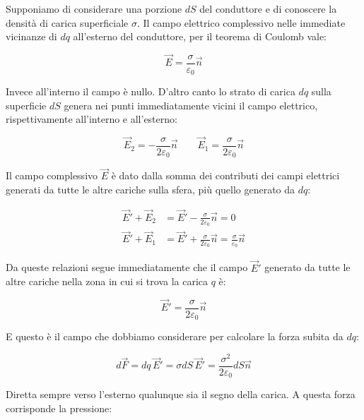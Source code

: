 \begin{figure}[htpb]
\end{figure}
\FloatBarrier

Supponiamo di considerare una porzione $dS$ del conduttore e di conoscere la densità di carica superficiale $ \sigma  $. Il campo elettrico complessivo nelle immediate vicinanze di $dq$ all'esterno del conduttore, per il teorema di Coulomb vale:

\[
	\vec{E} = \frac{\sigma}{\varepsilon_0} \vec{n}
\]

Invece all'interno il campo è nullo. D'altro canto lo strato di carica $dq$ sulla superficie $dS$ genera nei punti immediatamente vicini il campo elettrico, rispettivamente all'interno e all'esterno:

\[
	\vec{E}_2 = - \frac{\sigma}{2\varepsilon_0} \vec{n} \qquad \vec{E}_1=\frac{\sigma}{2\varepsilon_0}\vec{n}
\]

Il campo complessivo $\vec{E}$ è dato dalla somma dei contributi dei campi elettrici generati da tutte le altre cariche sulla sfera, più quello generato da $dq$:

\begin{align*}
	\vec{E}' + \vec{E}_2 &= \vec{E}' - \frac{\sigma}{2\varepsilon_0}\vec{n} = 0 \\
	\vec{E}' + \vec{E}_1 &= \vec{E}' + \frac{\sigma}{2\varepsilon_0}\vec{n} = \frac{\sigma}{\varepsilon_0} \vec{n}
\end{align*}

Da queste relazioni segue immediatamente che il campo $\vec{E}'$ generato da tutte le altre cariche nella zona in cui si trova la carica $q$ è:

\[
	\vec{E}'=\frac{\sigma}{2\varepsilon_0} \vec{n}
\]

E questo è il campo che dobbiamo considerare per calcolare la forza subita da $dq$:

\[
	d\vec{F} = dq\,\vec{E}' = \sigma dS\,\vec{E}' = \frac{\sigma^2}{2\varepsilon_0}dS\vec{n}
\]

Diretta sempre verso l'esterno qualunque sia il segno della carica. A questa forza corrisponde la pressione:

